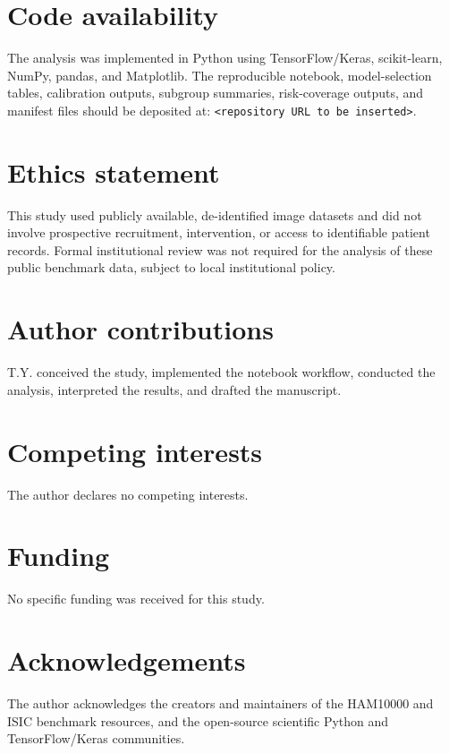 \documentclass[11pt,a4paper]{article}
\newcommand{\dataset}{HAM10000}
\newcommand{\codeplaceholder}{\texttt{<repository URL to be inserted>}}
\begin{document}
\section*{Code availability}

The analysis was implemented in Python using TensorFlow/Keras, scikit-learn, NumPy, pandas, and Matplotlib. The reproducible notebook, model-selection tables, calibration outputs, subgroup summaries, risk-coverage outputs, and manifest files should be deposited at: \codeplaceholder{}.

\section*{Ethics statement}

This study used publicly available, de-identified image datasets and did not involve prospective recruitment, intervention, or access to identifiable patient records. Formal institutional review was not required for the analysis of these public benchmark data, subject to local institutional policy.

\section*{Author contributions}

T.Y. conceived the study, implemented the notebook workflow, conducted the analysis, interpreted the results, and drafted the manuscript.

\section*{Competing interests}

The author declares no competing interests.

\section*{Funding}

No specific funding was received for this study.

\section*{Acknowledgements}

The author acknowledges the creators and maintainers of the \dataset{} and ISIC benchmark resources, and the open-source scientific Python and TensorFlow/Keras communities.
\end{document}
